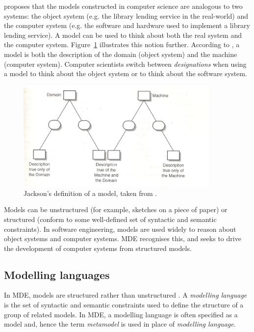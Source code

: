\cite{jackson95software} proposes that the models constructed in computer science are analogous to two systems: the object system (e.g. the library lending service in the real-world) and the computer system (e.g. the software and hardware used to implement a library lending service). A model can be used to think about both the real system and the computer system. Figure~\ref{fig:jackson_model} illustrates this notion further. According to \cite{jackson95software}, a model is both the description of the domain (object system) and the machine (computer system). Computer scientists switch between \emph{designations} when using a model to think about the object system or to think about the software system.

\begin{figure}[htbp]
  \begin{center}
    \leavevmode
    \includegraphics[width=10cm]{2.Background/images/jackson_model.png}
  \end{center}
  \caption[Jackson's definition of a model]{Jackson's definition of a model, taken from \cite[pg.125]{jackson95software}.}
  \label{fig:jackson_model}
\end{figure}

Models can be unstructured (for example, sketches on a piece of paper) or structured (conform to some well-defined set of syntactic and semantic constraints). In software engineering, models are used widely to reason about object systems and computer systems. MDE recognises this, and seeks to drive the development of computer systems from structured models.

\subsection{Modelling languages}
\label{subsec:modelling_languages}
In MDE, models are structured rather than unstructured \cite{kolovos09thesis}. A \emph{modelling language} is the set of syntactic and semantic constraints used to define the structure of a group of related models. In MDE, a modelling language is often specified as a model and, hence the term \emph{metamodel} is used in place of \emph{modelling language}.

